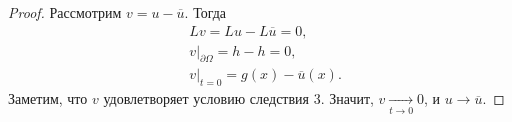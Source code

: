 \begin{proof}
Рассмотрим $v = u - \overline{u}$. Тогда
\begin{align*}
& Lv = Lu - L\overline{u} = 0, \\
& v\Big\rvert_{\partial \Omega} = h - h = 0, \\
& v\Big\rvert_{t = 0} = g(x) - \overline{u}(x).
\end{align*}
Заметим, что $v$ удовлетворяет условию следствия 3. Значит, $ v \xrightarrow[t \to 0]{} 0$, и $ u \to \overline{u}$.

\end{proof}